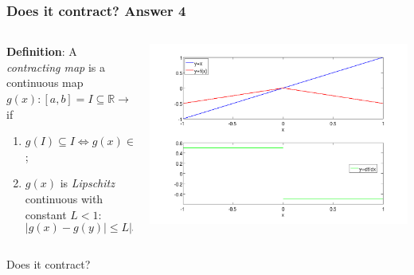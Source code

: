 \documentclass{beamer}
\begin{document}
\begin{frame}
\frametitle{Does it contract? Answer 4}

\begin{columns}
    \begin{column}{0.45\textwidth}
  {\bf Definition}: A \emph{contracting map} is a continuous map
  $g(x) : [a, b] = I \subseteq \mathbb{R} \rightarrow \mathbb{R}$ if
\begin{enumerate}
  \item $g(I) \subseteq I \Leftrightarrow g(x) \in I \, \, \, \forall
    x \in I$;
  \item $g(x)$ is \emph{Lipschitz} continuous with constant $L < 1$:
    \begin{equation*}
      | g(x) - g(y) | \leq L | x - y | \, \, \, \forall x, y \in I.
    \end{equation*}
  \end{enumerate}
\end{column}
\begin{column}{0.55\textwidth}
  \begin{center}
   \includegraphics[width=\textwidth]{figures/cmap4}
  \end{center}
\end{column}
\end{columns}
\begin{overlayarea}{\textwidth}{0.1\textheight}
Does it contract?  
\end{overlayarea}
\end{frame}
\end{document}
